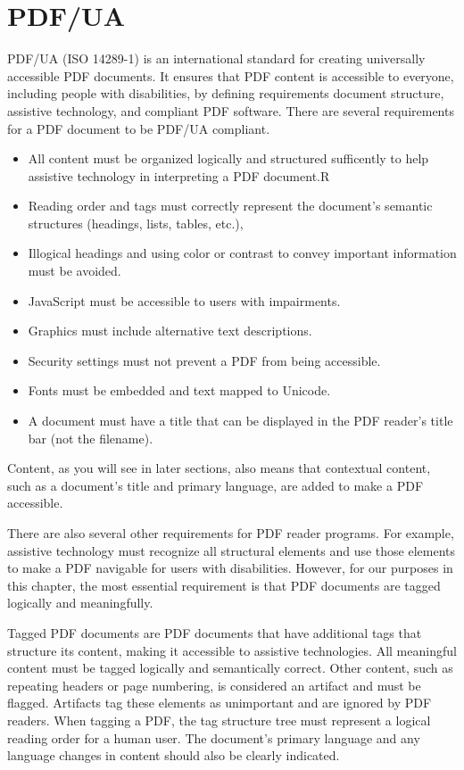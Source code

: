 \documentclass[american]{tufte-book}
\numberwithin{equation}{section}
\numberwithin{figure}{section}
\begin{document}
{{\section{PDF/UA}

PDF/UA (ISO 14289-1) is an international standard for creating universally
accessible PDF documents.\cite{iso_central_secretary_systems_2016}
It ensures that PDF content is accessible to everyone, including people
with disabilities, by defining requirements document structure, assistive
technology, and compliant PDF software. There are several requirements
for a PDF document to be PDF/UA compliant. 
\begin{itemize}
\item All content must be organized logically and structured sufficently to help assistive technology in interpreting a PDF document.R
\item Reading order and tags must correctly
represent the document's semantic structures (headings, lists, tables,
etc.),
\item Illogical headings and using color or contrast to convey important
information must be avoided.
\item JavaScript must be accessible to users with impairments.
\item Graphics must include alternative text descriptions.
\item Security settings must not prevent a PDF from being accessible.
\item Fonts must be embedded and text mapped to Unicode.
\item A document must have a title
that can be displayed in the PDF reader's title bar (not the filename).
\end{itemize}
Content, as you will see in later sections, also means that contextual
content, such as a document's title and primary language, are added
to make a PDF accessible. 

There are also several other requirements for
PDF reader programs. For example, assistive technology must recognize
all structural elements and use those elements to make a PDF navigable
for users with disabilities. However, for our purposes in this chapter,
the most essential requirement is that PDF documents are tagged logically
and meaningfully.

Tagged PDF documents are PDF documents that have additional tags that
structure its content, making it accessible to assistive technologies.
All meaningful content must be tagged logically and semantically correct.
Other content, such as repeating headers or page numbering, is considered
an artifact and must be flagged. Artifacts tag these elements as unimportant
and are ignored by PDF readers. When tagging a PDF,
the tag structure tree must represent a logical reading order for
a human user. The document's primary language and any language changes
in content should also be clearly indicated. 

}}
\end{document}
